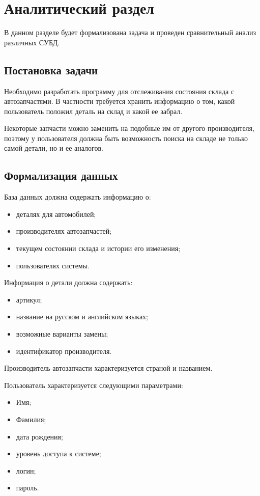 \chapter{Аналитический раздел}

В данном разделе будет формализована задача и проведен сравнительный анализ различных СУБД.

\section{Постановка задачи}
Необходимо разработать программу для отслеживания состояния склада с автозапчастями. В частности требуется хранить информацию о том, какой пользователь положил деталь на склад и какой ее забрал.

Некоторые запчасти можно заменить на подобные им от другого производителя, поэтому у пользователя должна быть возможность поиска на складе не только самой детали, но и ее аналогов.

\section{Формализация данных}\label{sec:formalisation}
База данных должна содержать информацию о:
\begin{itemize}
	\item деталях для автомобилей;
	\item производителях автозапчастей;
	\item текущем состоянии склада и истории его изменения;
	\item пользователях системы.
\end{itemize}

Информация о детали должна содержать:
\begin{itemize}
	\item артикул;
	\item название на русском и английском языках;
	\item возможные варианты замены;
	\item идентификатор производителя.
\end{itemize}

Производитель автозапчасти характеризуется страной и названием.

Пользователь характеризуется следующими параметрами:
\begin{itemize}
	\item Имя;
	\item Фамилия;
	\item дата рождения;
	\item уровень доступа к системе;
	\item логин;
	\item пароль.
\end{itemize}


